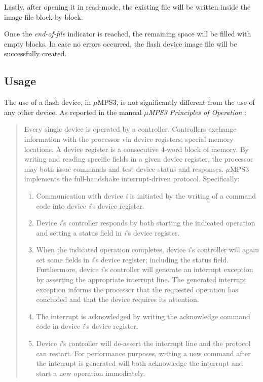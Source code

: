 \documentclass[12pt,a4paper,openright,twoside]{report}
\begin{document}
Lastly, after opening it in read-mode, the existing file will be written inside the image file block-by-block.

Once the \textit{end-of-file} indicator is reached, the remaining space will be filled with empty blocks.
In case no errors occurred, the flash device image file will be successfully created.

\subsection{Usage}
The use of a flash device, in $\mu$MPS3, is not significantly different from the use of any other device.
As reported in the manual \textit{$\mu$MPS3 Principles of Operation} \cite{pops}:
\begin{quote}
	Every single device is operated by a controller.
	Controllers exchange information with the processor via device registers; special memory locations.
	A device register is a consecutive 4-word block of memory.
	By writing and reading specific fields in a given device register, the processor may both issue commands and test device status and responses.
	$\mu$MPS3 implements the full-handshake interrupt-driven protocol.
	Specifically:
	\begin{enumerate}
		\item Communication with device \textit{i} is initiated by the writing of a command code into device \textit{i}'s device register.
		\item Device \textit{i}'s controller responds by both starting the indicated operation and setting a status field in \textit{i}'s device register.
		\item When the indicated operation completes, device \textit{i}'s controller will again set some fields in \textit{i}'s device register; including the status field.
		      Furthermore, device \textit{i}'s controller will generate an interrupt exception by asserting the appropriate interrupt line.
		      The generated interrupt exception informs the processor that the requested operation has concluded and that the device requires its attention.
		\item The interrupt is acknowledged by writing the acknowledge command code in device \textit{i}'s device register.
		\item Device \textit{i}'s controller will de-assert the interrupt line and the protocol can restart.
		      For performance purposes, writing a new command after the interrupt is generated will both acknowledge the interrupt and start a new operation immediately.
	\end{enumerate}
\end{quote}
\end{document}
